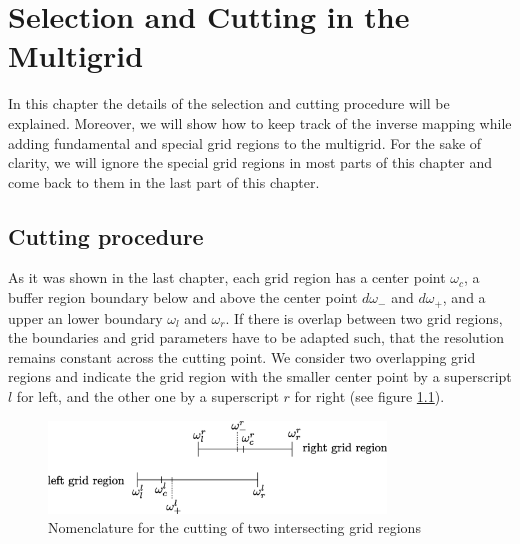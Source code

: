 \chapter{Selection and Cutting in the Multigrid} \label{chapter:multigrid_selection_and_cutting}
In this chapter the details of the selection and cutting procedure will be explained. Moreover, we will show how to keep track of the inverse mapping while adding fundamental and special grid regions to the multigrid. For the sake of clarity, we will ignore the special grid regions in most parts of this chapter and come back to them in the last part of this chapter.
\section{Cutting procedure}\label{sec:cutting_procedure}
As it was shown in the last chapter, each grid region has a center point $\omega_c$, a buffer region boundary below and above the center point $d\omega_-$ and $d\omega_+$, and a upper an lower boundary $\omega_l$ and $\omega_r$. If there is overlap between two grid regions, the boundaries and grid parameters have to be adapted such, that the resolution remains constant across the cutting point. We consider two overlapping grid regions and indicate the grid region with the smaller center point by a superscript $l$ for left, and the other one by a superscript $r$ for right (see figure \ref{fig:cutting_gr}).

\begin{figure}[h]
	\centering
	\includegraphics[width=0.8\textwidth]{pics/cutting_gr.eps}
	\caption{Nomenclature for the cutting of two intersecting grid regions}
	\label{fig:cutting_gr}
\end{figure}

